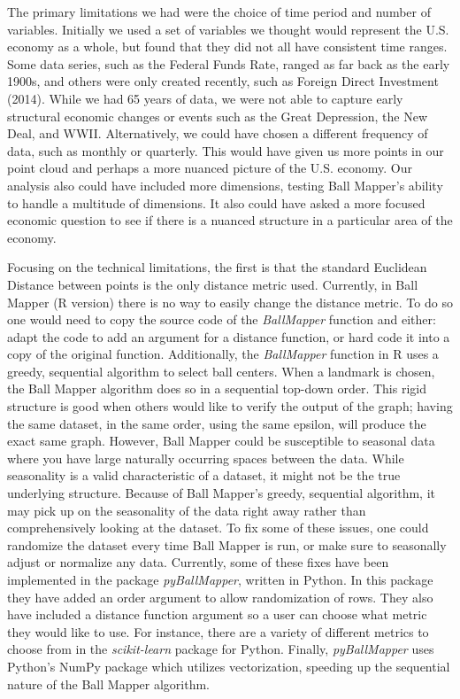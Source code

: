 \documentclass[
  10pt,
  letterpaper,
  DIV=11,
  numbers=noendperiod]{scrartcl}
\begin{document}
The primary limitations we had were the choice of time period and number
of variables. Initially we used a set of variables we thought would
represent the U.S. economy as a whole, but found that they did not all
have consistent time ranges. Some data series, such as the Federal Funds
Rate, ranged as far back as the early 1900s, and others were only
created recently, such as Foreign Direct Investment (2014). While we had
65 years of data, we were not able to capture early structural economic
changes or events such as the Great Depression, the New Deal, and WWII.
Alternatively, we could have chosen a different frequency of data, such
as monthly or quarterly. This would have given us more points in our
point cloud and perhaps a more nuanced picture of the U.S. economy. Our
analysis also could have included more dimensions, testing Ball Mapper's
ability to handle a multitude of dimensions. It also could have asked a
more focused economic question to see if there is a nuanced structure in
a particular area of the economy.

Focusing on the technical limitations, the first is that the standard
Euclidean Distance between points is the only distance metric used.
Currently, in Ball Mapper (R version) there is no way to easily change
the distance metric. To do so one would need to copy the source code of
the \emph{BallMapper} function and either: adapt the code to add an
argument for a distance function, or hard code it into a copy of the
original function. Additionally, the \emph{BallMapper} function in R
uses a greedy, sequential algorithm to select ball centers. When a
landmark is chosen, the Ball Mapper algorithm does so in a sequential
top-down order. This rigid structure is good when others would like to
verify the output of the graph; having the same dataset, in the same
order, using the same epsilon, will produce the exact same graph.
However, Ball Mapper could be susceptible to seasonal data where you
have large naturally occurring spaces between the data. While
seasonality is a valid characteristic of a dataset, it might not be the
true underlying structure. Because of Ball Mapper's greedy, sequential
algorithm, it may pick up on the seasonality of the data right away
rather than comprehensively looking at the dataset. To fix some of these
issues, one could randomize the dataset every time Ball Mapper is run,
or make sure to seasonally adjust or normalize any data. Currently, some
of these fixes have been implemented in the package \emph{pyBallMapper},
written in Python. In this package they have added an order argument to
allow randomization of rows. They also have included a distance function
argument so a user can choose what metric they would like to use. For
instance, there are a variety of different metrics to choose from in the
\emph{scikit-learn} package for Python. Finally, \emph{pyBallMapper}
uses Python's NumPy package which utilizes vectorization, speeding up
the sequential nature of the Ball Mapper algorithm.
\end{document}

